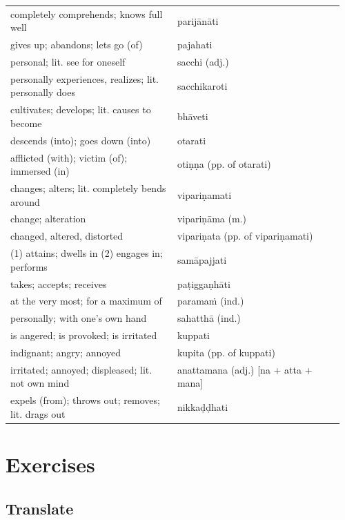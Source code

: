 \documentclass[11pt,oneside]{memoir}
\begin{document}
\begin{longtable}{L{0.48\linewidth} L{0.48\linewidth}}
completely comprehends; knows full well & parijānāti\\[0pt]
gives up; abandons; lets go (of) & pajahati\\[0pt]
personal; lit. see for oneself & sacchi (adj.)\\[0pt]
personally experiences, realizes; lit. personally does & sacchikaroti\\[0pt]
cultivates; develops; lit. causes to become & bhāveti\\[0pt]
descends (into); goes down (into) & otarati\\[0pt]
afflicted (with); victim (of); immersed (in) & otiṇṇa (pp. of otarati)\\[0pt]
changes; alters; lit. completely bends around & vipariṇamati\\[0pt]
change; alteration & vipariṇāma (m.)\\[0pt]
changed, altered, distorted & vipariṇata (pp. of vipariṇamati)\\[0pt]
(1) attains; dwells in (2) engages in; performs & samāpajjati\\[0pt]
takes; accepts; receives & paṭiggaṇhāti\\[0pt]
at the very most; for a maximum of & paramaṁ (ind.)\\[0pt]
personally; with one’s own hand & sahatthā (ind.)\\[0pt]
is angered; is provoked; is irritated & kuppati\\[0pt]
indignant; angry; annoyed & kupita (pp. of kuppati)\\[0pt]
irritated; annoyed; displeased; lit. not own mind & anattamana (adj.) [na + atta + mana]\\[0pt]
expels (from); throws out; removes; lit. drags out & nikkaḍḍhati\\[0pt]
\end{longtable}

\clearpage

\section{Exercises}
\label{sec:orgc6f016d}
\subsection{Translate}
\label{sec:org1b35d7c}
\end{document}
